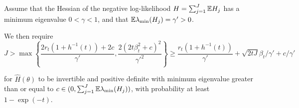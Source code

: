 \begin{lem}
    \label{lemma:hess_bound}
    Assume that the Hessian of the negative log-likelihood $H=\sum_{j=1}^J \mathbb{E} H_j$ has a minimum eigenvalue $0<\gamma<1$, and that $\mathbb{E} \lambda_{\min} (H_j) = \gamma' > 0$. 
    
    We then require 
    \begin{equation}
        J > \max\left\{\frac{2r_t(1+h^{-1}(t)) + 2c}{\gamma'}, \frac{2(2t\beta_t^2+c)^2}{\gamma'^2}\right\} \geq  \frac{r_t(1+h^{-1}(t))}{\gamma'} + \sqrt{2tJ}\beta_t/\gamma' + c/\gamma'
    \end{equation}
    
    for $\hat{H}(\theta)$ to be invertible and positive definite with minimum eigenvalue greater than or equal to $c \in (0, \sum_{j=1}^J \mathbb{E}\lambda_{\min}(H_j))$, with probability at least $1-\exp(-t)$.
\end{lem}

